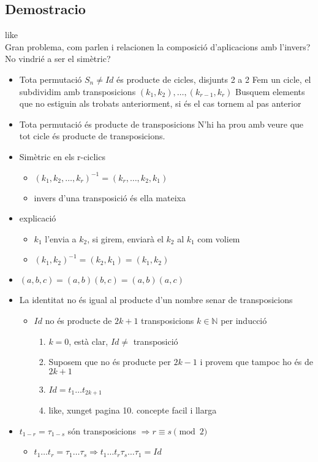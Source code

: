 \documentclass{article}
\newcommand{\N}{\mathbb{N}}
\begin{document}
\subsection*{Demostracio}
like\\
Gran problema, com parlen i relacionen la composició d'aplicacions amb l'invers? No vindrié a ser el simètric?
\begin{itemize}
\item Tota permutació $S_n \neq Id$ és producte de cicles, disjunts 2 a 2
	\subitem Fem un cicle, el subdividim amb transposicions $(k_1, k_2), \dots, (k_{r-1}, k_r)$
	\subitem Busquem elements que no estiguin als trobats anteriorment, si és el cas tornem al pas anterior
\item Tota permutació és producte de transposicions
	\subitem N'hi ha prou amb veure que tot cicle és producte de transposicions.
\item Simètric en els r-ciclics
	\begin{itemize}
	\item $(k_1, k_2, \dots, k_r)^{-1} = (k_r, \dots, k_2, k_1)$
	\item invers d'una transposició és ella mateixa
	\end{itemize}
\item explicació
	\begin{itemize}
	\item $k_1$ l'envia a $k_2$, si girem, enviarà el $k_2$ al $k_1$ com voliem
	\item $(k_1, k_2)^{-1} = (k_2, k_1) = (k_1, k_2)$
	\end{itemize}
\item $(a, b, c) = (a, b)(b, c) = (a, b)(a, c)$
\item La identitat no és igual al producte d'un nombre senar de transposicions
	\begin{itemize}
	\item $Id$ no és producte de $2k +1$ transposicions $k \in \N$ per inducció
		\begin{enumerate}
		\item $k = 0$, està clar, $Id \neq$ transposició
		\item Suposem que no és producte per $2k -1$ i provem que tampoc ho és de $2k +1$
		\item $Id = t_1\dots t_{2k+1}$
		\item like, xunget pagina 10. concepte facil i llarga
		\end{enumerate}
	\end{itemize}
\item $t_{1-r} = \tau_{1-s}$ són transposicions
	\subitem $\Rightarrow r \equiv s \pmod{2}$
	\begin{itemize}
	\item $t_1\dots t_r = \tau_1\dots \tau_s \Rightarrow t_1\dots t_r \tau_s \dots \tau_1 = Id$
	\end{itemize}
\end{itemize}
\end{document}
